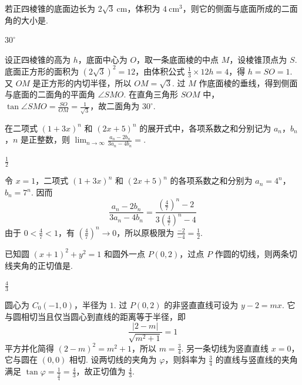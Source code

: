 \begin{problem}
若正四棱锥的底面边长为 \(2\sqrt{3}\mathrm{~cm}\)，体积为 \(4\mathrm{~cm}^{3}\)，则它的侧面与底面所成的二面角的大小是\fillinblank{}.

\begin{answer}
\(30^\circ\)
\end{answer}

\begin{solution}
设正四棱锥的高为 \(h\)，底面中心为 \(O\)，取一条底面棱的中点 \(M\)，设棱锥顶点为 \(S\). 底面正方形的面积为 \((2\sqrt{3})^2=12\)，由体积公式 \(\frac13\times12h=4\)，得 \(h=SO=1\). 又 \(OM\) 是正方形的内切半径，所以 \(OM=\sqrt{3}\). 过 \(M\) 作底面棱的垂线，得到侧面与底面的二面角的平面角 \(\angle SMO\). 在直角三角形 \(SOM\) 中，\(\tan\angle SMO=\frac{SO}{OM}=\frac1{\sqrt3}\)，故二面角为 \(30^\circ\).
\end{solution}
\end{problem}

\begin{problem}
在二项式 \((1 + 3x)^{n}\) 和 \((2x + 5)^{n}\) 的展开式中，各项系数之和分别记为 \(a_{n}\)，\(b_{n}\)，\(n\) 是正整数，则 \(\displaystyle\lim_{n\to\infty}\frac{a_n - 2b_n}{3a_n - 4b_n} =\)\fillinblank{}.

\begin{answer}
\(\frac{1}{2}\)
\end{answer}

\begin{solution}
令 \(x=1\)，二项式 \((1+3x)^n\) 和 \((2x+5)^n\) 的各项系数之和分别为 \(a_n=4^n\)，\(b_n=7^n\). 因而
\[
\frac{a_n-2b_n}{3a_n-4b_n}=\frac{(\frac{4}{7})^n-2}{3(\frac{4}{7})^n-4}
\]
由于 \(0<\frac47<1\)，有 \(\left(\frac47\right)^n\to0\)，所以原极限为 \(\frac{-2}{-4}=\frac12\).
\end{solution}
\end{problem}

\begin{problem}
已知圆 \((x + 1)^2 + y^2 = 1\) 和圆外一点 \(P(0,2)\)，过点 \(P\) 作圆的切线，则两条切线夹角的正切值是\fillinblank{}.

\begin{answer}
\(\frac{4}{3}\)
\end{answer}

\begin{solution}
圆心为 \(C_0(-1,0)\)，半径为 \(1\). 过 \(P(0,2)\) 的非竖直直线可设为 \(y-2=m x\). 它与圆相切当且仅当圆心到直线的距离等于半径，即
\[
\frac{|2-m|}{\sqrt{m^2+1}}=1
\]
平方并化简得 \((2-m)^2=m^2+1\)，所以 \(m=\frac34\). 另一条切线为竖直直线 \(x=0\)，它与圆在 \((0,0)\) 相切. 设两切线的夹角为 \(\varphi\)，则斜率为 \(\frac34\) 的直线与竖直线的夹角满足 \(\tan\varphi=\frac{1}{\frac{3}{4}}=\frac43\)，故正切值为 \(\frac43\).
\end{solution}
\end{problem}

